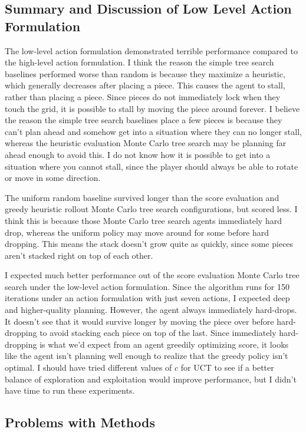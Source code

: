 \documentclass[letterpaper]{article} %
\begin{document}
\subsection{Summary and Discussion of Low Level Action Formulation}

The low-level action formulation demonstrated terrible performance compared to the high-level action formulation. I think the reason the simple tree search baselines performed worse than random is because they maximize a heuristic, which generally decreases after placing a piece. This causes the agent to stall, rather than placing a piece. Since pieces do not immediately lock when they touch the grid, it is possible to stall by moving the piece around forever. I believe the reason the simple tree search baselines place a few pieces is because they can't plan ahead and somehow get into a situation where they can no longer stall, whereas the heuristic evaluation Monte Carlo tree search may be planning far ahead enough to avoid this. I do not know how it is possible to get into a situation where you cannot stall, since the player should always be able to rotate or move in some direction.

The uniform random baseline survived longer than the score evaluation and greedy heuristic rollout Monte Carlo tree search configurations, but scored less. I think this is because those Monte Carlo tree search agents immediately hard drop, whereas the uniform policy may move around for some before hard dropping. This means the stack doesn't grow quite as quickly, since some pieces aren't stacked right on top of each other.

I expected much better performance out of the score evaluation Monte Carlo tree search under the low-level action formulation. Since the algorithm runs for 150 iterations under an action formulation with just seven actions, I expected deep and higher-quality planning. However, the agent always immediately hard-drops. It doesn't see that it would survive longer by moving the piece over before hard-dropping to avoid stacking each piece on top of the last. Since immediately hard-dropping is what we'd expect from an agent greedily optimizing score, it looks like the agent isn't planning well enough to realize that the greedy policy isn't optimal. I should have tried different values of \(c\) for UCT to see if a better balance of exploration and exploitation would improve performance, but I didn't have time to run these experiments.

\subsection{Problems with Methods}
\end{document}
